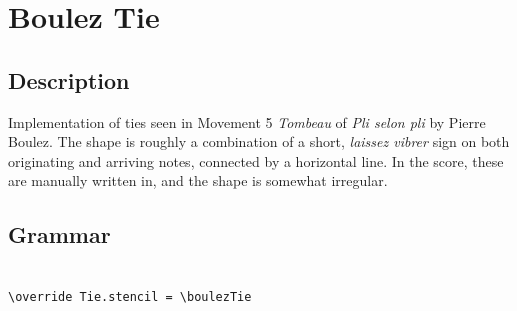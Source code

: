 \vfill \break



\section {Boulez Tie}
\label{sec:arrow_lines}
\hfill

\subsection{Description}
Implementation of ties seen in Movement 5 \textit{Tombeau} of \textit{Pli selon pli} by Pierre Boulez\autocite{RN1000}. The shape is roughly a combination of a short, \textit{laissez vibrer} sign on both originating and arriving notes, connected by a horizontal line. In the score, these are manually written in, and the shape is somewhat irregular. 
 
\subsection{Grammar}
\begin{verbatim}

\override Tie.stencil = \boulezTie
 
\end{verbatim}



